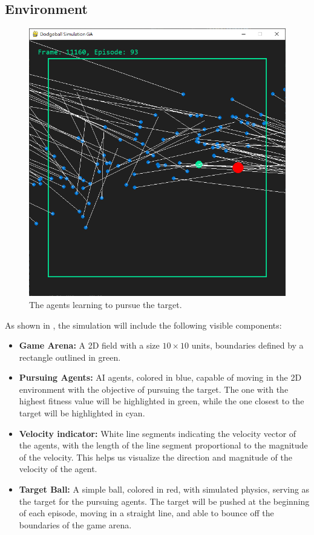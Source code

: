 \documentclass[sigconf]{acmart}
\begin{document}
\subsection{Environment}
\begin{figure}[H]
  \centering
  \includegraphics[width=0.9\linewidth]{imgs/demo01.png}
  \caption{The agents learning to pursue the target.}
  \label{fig:ball_demo}
\end{figure}
As shown in , the simulation will include the following visible components:
\begin{itemize}
  \item \textbf{Game Arena:} A 2D field with a size $10\times10$ units, boundaries defined by a rectangle outlined in green.
  \item \textbf{Pursuing Agents:} AI agents, colored in blue, capable of moving in the 2D environment with the objective of pursuing the target. The one with the highest fitness value will be highlighted in green, while the one closest to the target will be highlighted in cyan.
  \item \textbf{Velocity indicator:} White line segments indicating the velocity vector of the agents, with the length of the line segment proportional to the magnitude of the velocity. This helps us visualize the direction and magnitude of the velocity of the agent.
  \item \textbf{Target Ball:} A simple ball, colored in red, with simulated physics, serving as the target for the pursuing agents. The target will be pushed at the beginning of each episode, moving in a straight line, and able to bounce off the boundaries of the game arena.
\end{itemize}
\end{document}

